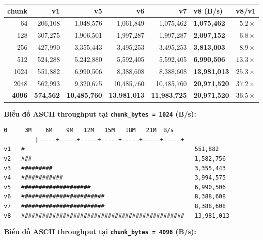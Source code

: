 \documentclass[11pt,a4paper]{article}
\begin{document}
\begin{center}
\begin{tabularx}{\linewidth}{rrrrrXr}
\toprule
\textbf{chunk} & \textbf{v1} & \textbf{v5} & \textbf{v6} & \textbf{v7} & \textbf{v8 (B/s)} & \textbf{v8/v1} \\
\midrule
64   & 206{,}108   & 1{,}048{,}576  & 1{,}061{,}849  & 1{,}075{,}462  & \textbf{1{,}075{,}462}  & $5.2\times$ \\
128  & 307{,}275   & 1{,}906{,}501  & 1{,}997{,}287  & 1{,}997{,}287  & \textbf{2{,}097{,}152}  & $6.8\times$ \\
256  & 427{,}990   & 3{,}355{,}443  & 3{,}495{,}253  & 3{,}495{,}253  & \textbf{3{,}813{,}003}  & $8.9\times$ \\
512  & 524{,}288   & 5{,}242{,}880  & 5{,}592{,}405  & 5{,}592{,}405  & \textbf{6{,}990{,}506}  & $13.3\times$ \\
1024 & 551{,}882   & 6{,}990{,}506  & 8{,}388{,}608  & 8{,}388{,}608  & \textbf{13{,}981{,}013} & $25.3\times$ \\
2048 & 562{,}993   & 9{,}320{,}675  & 10{,}485{,}760 & 10{,}485{,}760 & \textbf{20{,}971{,}520} & $37.2\times$ \\
\textbf{4096} & \textbf{574{,}562} & \textbf{10{,}485{,}760} & \textbf{13{,}981{,}013} & \textbf{11{,}983{,}725} & \textbf{20{,}971{,}520} & $\mathbf{36.5\times}$ \\
\bottomrule
\end{tabularx}
\end{center}

\textbf{Biểu đồ ASCII throughput tại \texttt{chunk\_bytes = 1024} (B/s):}

\begin{lstlisting}[style=plain]
         0     3M    6M    9M   12M   15M   18M   21M  B/s
         |-----+-----+-----+-----+-----+-----+-----+
v1   #                                                 551,882
v2   ###                                               1,582,756
v3   #########                                         3,355,443
v4   ############                                      3,994,575
v5   ####################                              6,990,506
v6   ########################                          8,388,608
v7   ########################                          8,388,608
v8   ###############################################   13,981,013
\end{lstlisting}

\textbf{Biểu đồ ASCII throughput tại \texttt{chunk\_bytes = 4096} (B/s):}
\end{document}
